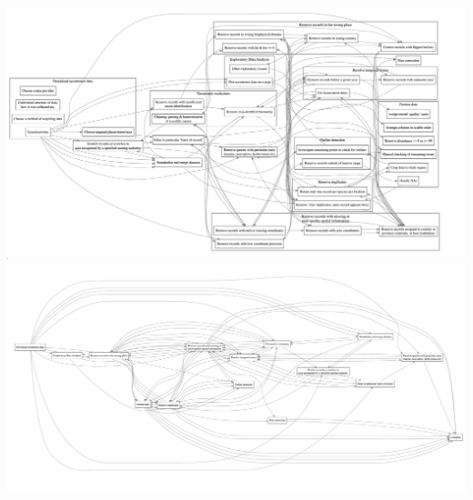 \documentclass[
  letterpaper,
  DIV=11,
  numbers=noendperiod,
  oneside]{scrreprt}
\begin{document}
\includegraphics{images/complex_workflow.png}
\includegraphics{images/simplified_workflow.png}
\end{document}
